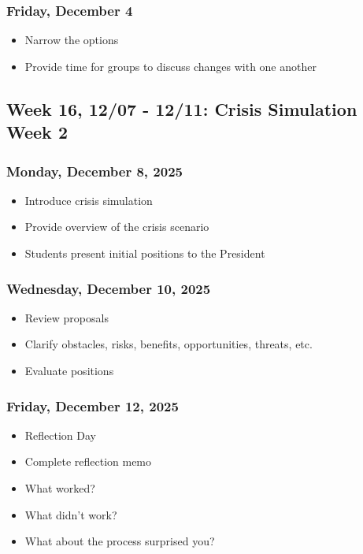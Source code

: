 \documentclass[
  letterpaper,
  DIV=11,
  numbers=noendperiod]{scrartcl}
\providecommand{\tightlist}{%
  \setlength{\itemsep}{0pt}\setlength{\parskip}{0pt}}
\begin{document}
\subsubsection{Friday, December 4}\label{friday-december-4}

\begin{itemize}
\tightlist
\item
  Narrow the options
\item
  Provide time for groups to discuss changes with one another
\end{itemize}

\subsection{Week 16, 12/07 - 12/11: Crisis Simulation Week
2}\label{week-16-1207---1211-crisis-simulation-week-2}

\subsubsection{Monday, December 8, 2025}\label{monday-december-8-2025}

\begin{itemize}
\tightlist
\item
  Introduce crisis simulation
\item
  Provide overview of the crisis scenario
\item
  Students present initial positions to the President
\end{itemize}

\subsubsection{Wednesday, December 10,
2025}\label{wednesday-december-10-2025}

\begin{itemize}
\tightlist
\item
  Review proposals
\item
  Clarify obstacles, risks, benefits, opportunities, threats, etc.
\item
  Evaluate positions
\end{itemize}

\subsubsection{Friday, December 12, 2025}\label{friday-december-12-2025}

\begin{itemize}
\tightlist
\item
  Reflection Day
\item
  Complete reflection memo
\item
  What worked?
\item
  What didn't work?
\item
  What about the process surprised you?
\end{itemize}
\end{document}
